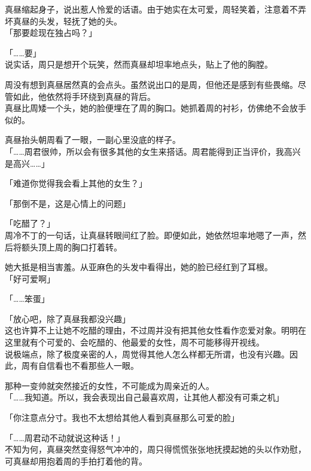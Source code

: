 真昼缩起身子，说出惹人怜爱的话语。由于她实在太可爱，周轻笑着，注意着不弄坏真昼的头发，轻抚了她的头。\\

「那要趁现在独占吗？」

「……要」\\

说实话，周只是想开个玩笑，然而真昼却坦率地点头，贴上了他的胸膛。

周没有想到真昼居然真的会点头。虽然说出口的是周，但他还是感到有些畏缩。尽管如此，他依然将手环绕到真昼的背后。\\

真昼比周矮一个头，她的脸便埋在了周的胸口。她抓着周的衬衫，仿佛绝不会放手似的。

真昼抬头朝周看了一眼，一副心里没底的样子。\\

「……周君很帅，所以会有很多其他的女生来搭话。周君能得到正当评价，我高兴是高兴……」

「难道你觉得我会看上其他的女生？」

「那倒不是，这是心情上的问题」

「吃醋了？」\\

周冷不丁的一句话，让真昼转眼间红了脸。即便如此，她依然坦率地嗯了一声，然后将额头顶上周的胸口打着转。

她大抵是相当害羞。从亚麻色的头发中看得出，她的脸已经红到了耳根。\\

「好可爱啊」

「……笨蛋」

「放心吧，除了真昼我都没兴趣」\\

这也许算不上让她不吃醋的理由，不过周并没有把其他女性看作恋爱对象。明明在这里就有个可爱的、会吃醋的、他最爱的女性，周不可能移得开视线。\\

说极端点，除了极度亲密的人，周觉得其他人怎么样都无所谓，也没有兴趣。因此，周有自信看也不看那些人一眼。

那种一变帅就突然接近的女性，不可能成为周亲近的人。\\

「……我知道。所以，我会表现出自己最喜欢周，让其他人都没有可乘之机」

「你注意点分寸。我也不太想给其他人看到真昼那么可爱的脸」

「……周君动不动就说这种话！」\\

不知为何，真昼突然变得怒气冲冲的，周只得慌慌张张地抚摸起她的头以作劝慰，可真昼却用抱着周的手拍打着他的背。\\

